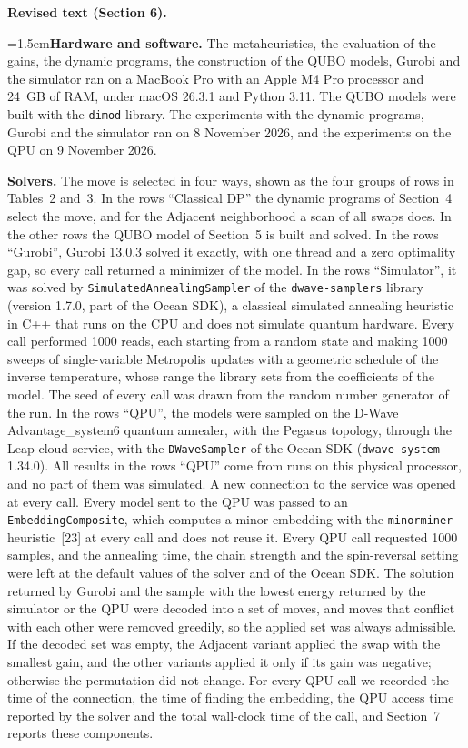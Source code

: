 \documentclass[12pt]{article}
\newcommand{\change}[3]{\par\smallskip\noindent\textbf{Revised text (#1).}\par
  {\leftskip=1.5em\noindent#3\par}}
\begin{document}
\change{Section 6}{The experiment was conducted in the test environment defined in [3], as follows. All experiments were conducted on a MacBook Pro with an M4 Pro processor, 24 GB of RAM, running macOS 26.3.1(a) and Python 3.11. \dots}{\textbf{Hardware and software.} The metaheuristics, the evaluation of the gains, the dynamic programs, the construction of the QUBO models, Gurobi and the simulator ran on a MacBook Pro with an Apple M4 Pro processor and 24~GB of RAM, under macOS 26.3.1 and Python 3.11. The QUBO models were built with the \texttt{dimod} library. The experiments with the dynamic programs, Gurobi and the simulator ran on 8 November 2026, and the experiments on the QPU on 9 November 2026.

\textbf{Solvers.} The move is selected in four ways, shown as the four groups of rows in Tables~2 and~3. In the rows ``Classical DP'' the dynamic programs of Section~4 select the move, and for the Adjacent neighborhood a scan of all swaps does. In the other rows the QUBO model of Section~5 is built and solved. In the rows ``Gurobi'', Gurobi 13.0.3 solved it exactly, with one thread and a zero optimality gap, so every call returned a minimizer of the model. In the rows ``Simulator'', it was solved by \texttt{SimulatedAnnealingSampler} of the \texttt{dwave-samplers} library (version 1.7.0, part of the Ocean SDK), a classical simulated annealing heuristic in C++ that runs on the CPU and does not simulate quantum hardware. Every call performed 1000 reads, each starting from a random state and making 1000 sweeps of single-variable Metropolis updates with a geometric schedule of the inverse temperature, whose range the library sets from the coefficients of the model. The seed of every call was drawn from the random number generator of the run. In the rows ``QPU'', the models were sampled on the D-Wave Advantage\_system6 quantum annealer, with the Pegasus topology, through the Leap cloud service, with the \texttt{DWaveSampler} of the Ocean SDK (\texttt{dwave-system} 1.34.0). All results in the rows ``QPU'' come from runs on this physical processor, and no part of them was simulated. A new connection to the service was opened at every call. Every model sent to the QPU was passed to an \texttt{EmbeddingComposite}, which computes a minor embedding with the \texttt{minorminer} heuristic~[23] at every call and does not reuse it. Every QPU call requested 1000 samples, and the annealing time, the chain strength and the spin-reversal setting were left at the default values of the solver and of the Ocean SDK. The solution returned by Gurobi and the sample with the lowest energy returned by the simulator or the QPU were decoded into a set of moves, and moves that conflict with each other were removed greedily, so the applied set was always admissible. If the decoded set was empty, the Adjacent variant applied the swap with the smallest gain, and the other variants applied it only if its gain was negative; otherwise the permutation did not change. For every QPU call we recorded the time of the connection, the time of finding the embedding, the QPU access time reported by the solver and the total wall-clock time of the call, and Section~7 reports these components.

}
\end{document}
